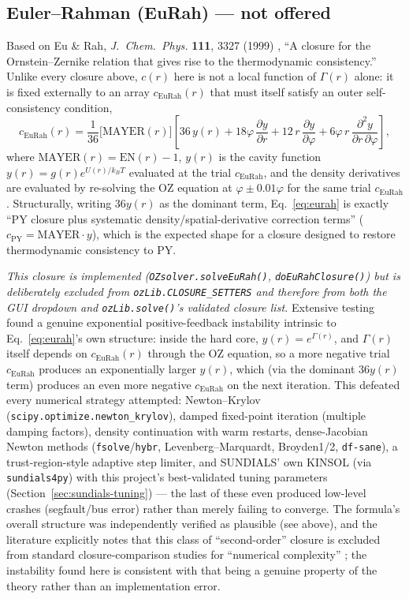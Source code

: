 \documentclass[11pt,a4paper]{article}
\newcommand{\code}[1]{\texttt{#1}}
\begin{document}
\subsection{Euler--Rahman (EuRah) --- not offered}
\label{sec:eurah}
Based on Eu \& Rah, \emph{J.\ Chem.\ Phys.} \textbf{111}, 3327 (1999)
\cite{eurah1999}, ``A closure for the Ornstein--Zernike relation that gives
rise to the thermodynamic consistency.'' Unlike every closure above, $c(r)$
here is not a local function of $\Gamma(r)$ alone: it is fixed externally to an
array $c_{\mathrm{EuRah}}(r)$ that must itself satisfy an outer self-consistency
condition,
\begin{equation}
  c_{\mathrm{EuRah}}(r) = \frac{1}{36}\Big[\mathrm{MAYER}(r)\Big]
  \left[36\,y(r) + 18\varphi\,\frac{\partial y}{\partial r} + 12\,r\,\frac{\partial y}{\partial\varphi}
  + 6\varphi\,r\,\frac{\partial^2 y}{\partial r\,\partial\varphi}\right],
  \label{eq:eurah}
\end{equation}
where $\mathrm{MAYER}(r)=\mathrm{EN}(r)-1$, $y(r)$ is the cavity function
$y(r)=g(r)e^{U(r)/k_BT}$ evaluated at the trial $c_{\mathrm{EuRah}}$, and the
density derivatives are evaluated by re-solving the OZ equation at $\varphi\pm
0.01\varphi$ for the same trial $c_{\mathrm{EuRah}}$. Structurally, writing
$36y(r)$ as the dominant term, Eq.~\ref{eq:eurah} is exactly ``PY closure plus
systematic density/spatial-derivative correction terms'' ($c_{\mathrm{PY}} =
\mathrm{MAYER}\cdot y$), which is the expected shape for a closure designed to
restore thermodynamic consistency to PY.

\emph{This closure is implemented (\code{OZsolver.solveEuRah()},
\code{doEuRahClosure()}) but is deliberately excluded from
\code{ozLib.CLOSURE\_SETTERS} and therefore from both the GUI dropdown and
\code{ozLib.solve()}'s validated closure list.} Extensive testing found a
genuine exponential positive-feedback instability intrinsic to
Eq.~\ref{eq:eurah}'s own structure: inside the hard core, $y(r)=e^{\Gamma(r)}$,
and $\Gamma(r)$ itself depends on $c_{\mathrm{EuRah}}(r)$ through the OZ
equation, so a more negative trial $c_{\mathrm{EuRah}}$ produces an
exponentially larger $y(r)$, which (via the dominant $36y(r)$ term) produces an
even more negative $c_{\mathrm{EuRah}}$ on the next iteration. This defeated
every numerical strategy attempted: Newton--Krylov (\code{scipy.optimize.newton\_krylov}),
damped fixed-point iteration (multiple damping factors), density continuation
with warm restarts, dense-Jacobian Newton methods
(\code{fsolve}/\code{hybr}, Levenberg--Marquardt, Broyden1/2, \code{df-sane}),
a trust-region-style adaptive step limiter, and SUNDIALS' own KINSOL (via
\code{sundials4py}) with this project's best-validated tuning parameters
(Section~\ref{sec:sundials-tuning}) --- the last of these even produced
low-level crashes (segfault/bus error) rather than merely failing to converge.
The formula's overall structure was independently verified as plausible (see
above), and the literature explicitly notes that this class of ``second-order''
closure is excluded from standard closure-comparison studies for
``numerical complexity'' \cite{pihlajamaa2024}; the instability found here is
consistent with that being a genuine property of the theory rather than an
implementation error.
\end{document}
